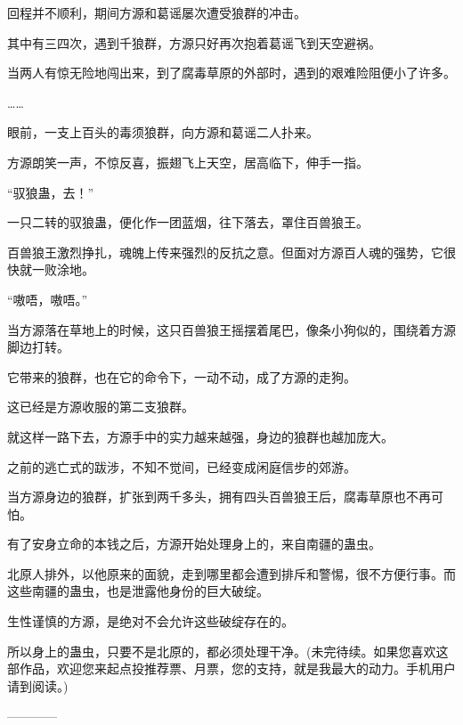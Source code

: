 \begin{this_body}
回程并不顺利，期间方源和葛谣屡次遭受狼群的冲击。

其中有三四次，遇到千狼群，方源只好再次抱着葛谣飞到天空避祸。

当两人有惊无险地闯出来，到了腐毒草原的外部时，遇到的艰难险阻便小了许多。

……

眼前，一支上百头的毒须狼群，向方源和葛谣二人扑来。

方源朗笑一声，不惊反喜，振翅飞上天空，居高临下，伸手一指。

“驭狼蛊，去！”

一只二转的驭狼蛊，便化作一团蓝烟，往下落去，罩住百兽狼王。

百兽狼王激烈挣扎，魂魄上传来强烈的反抗之意。但面对方源百人魂的强势，它很快就一败涂地。

“嗷唔，嗷唔。”

当方源落在草地上的时候，这只百兽狼王摇摆着尾巴，像条小狗似的，围绕着方源脚边打转。

它带来的狼群，也在它的命令下，一动不动，成了方源的走狗。

这已经是方源收服的第二支狼群。

就这样一路下去，方源手中的实力越来越强，身边的狼群也越加庞大。

之前的逃亡式的跋涉，不知不觉间，已经变成闲庭信步的郊游。

当方源身边的狼群，扩张到两千多头，拥有四头百兽狼王后，腐毒草原也不再可怕。

有了安身立命的本钱之后，方源开始处理身上的，来自南疆的蛊虫。

北原人排外，以他原来的面貌，走到哪里都会遭到排斥和警惕，很不方便行事。而这些南疆的蛊虫，也是泄露他身份的巨大破绽。

生性谨慎的方源，是绝对不会允许这些破绽存在的。

所以身上的蛊虫，只要不是北原的，都必须处理干净。(未完待续。如果您喜欢这部作品，欢迎您来起点投推荐票、月票，您的支持，就是我最大的动力。手机用户请到阅读。)

------------

\end{this_body}

